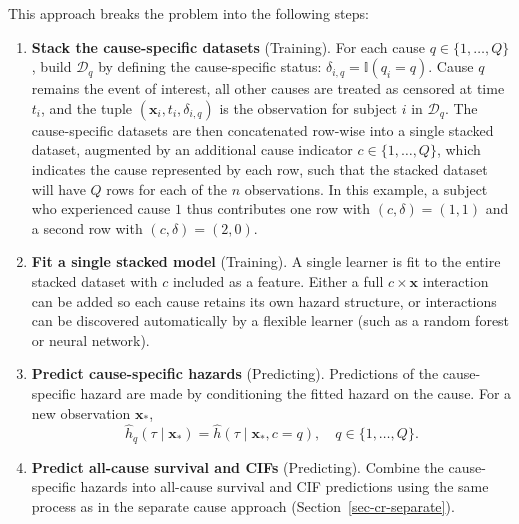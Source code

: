 \documentclass[
  letterpaper,
  krantz2]{style/krantz}
\begin{document}
This approach breaks the problem into the following steps:

\begin{enumerate}
\def\labelenumi{\arabic{enumi}.}
\item
  \textbf{Stack the cause-specific datasets} (Training). For each cause
  \(q \in \{1,\ldots,Q\}\), build \(\mathcal{D}_q\) by defining the
  cause-specific status: \(\delta_{i,q} = \mathbb{I}(q_i = q)\). Cause
  \(q\) remains the event of interest, all other causes are treated as
  censored at time \(t_i\), and the tuple
  \((\mathbf{x}_i, t_i, \delta_{i,q})\) is the observation for subject
  \(i\) in \(\mathcal{D}_q\). The cause-specific datasets are then
  concatenated row-wise into a single stacked dataset, augmented by an
  additional cause indicator \(c \in \{1, \ldots, Q\}\), which indicates
  the cause represented by each row, such that the stacked dataset will
  have \(Q\) rows for each of the \(n\) observations. In this example, a
  subject who experienced cause \(1\) thus contributes one row with
  \((c,\delta) = (1, 1)\) and a second row with \((c,\delta) = (2, 0)\).
\item
  \textbf{Fit a single stacked model} (Training). A single learner is
  fit to the entire stacked dataset with \(c\) included as a feature.
  Either a full \(c \times \mathbf{x}\) interaction can be added so each
  cause retains its own hazard structure, or interactions can be
  discovered automatically by a flexible learner (such as a random
  forest or neural network).
\item
  \textbf{Predict cause-specific hazards} (Predicting). Predictions of
  the cause-specific hazard are made by conditioning the fitted hazard
  on the cause. For a new observation \(\mathbf{x}_*\), \[
  \hat{h}_q(\tau \mid \mathbf{x}_*) = \hat{h}(\tau \mid \mathbf{x}_*, c = q), \quad q \in \{1,\ldots,Q\}.
  \]
\item
  \textbf{Predict all-cause survival and CIFs} (Predicting). Combine the
  cause-specific hazards into all-cause survival and CIF predictions
  using the same process as in the separate cause approach
  (Section~\ref{sec-cr-separate}).
\end{enumerate}
\end{document}
